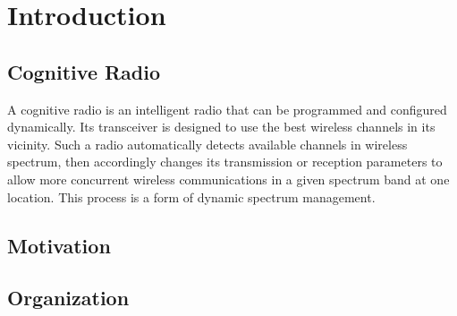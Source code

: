 \chapter{Introduction}
\section{Cognitive Radio}
A cognitive radio is an intelligent radio that can be programmed and configured dynamically. Its transceiver is designed to use the best wireless channels in its vicinity. Such a radio automatically detects available channels in wireless spectrum, then accordingly changes its transmission or reception parameters to allow more concurrent wireless communications in a given spectrum band at one location. This process is a form of dynamic spectrum management. \cite{wikiCR}

\section{Motivation}
\section{Organization}